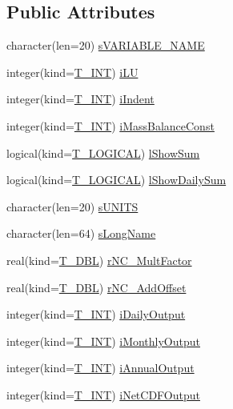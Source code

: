 \subsection*{Public Attributes}
\begin{DoxyCompactItemize}
\item 
character(len=20) \hyperlink{typetypes_1_1_t___s_t_a_t_s_ab81130a44a581fc3b22fea055a9be90d}{sVARIABLE\_\-NAME}
\item 
integer(kind=\hyperlink{namespacetypes_a4e4d040a4425196c4d43be63e7e6103a}{T\_\-INT}) \hyperlink{typetypes_1_1_t___s_t_a_t_s_a045c76162dcdf4837f2f848823b16254}{iLU}
\item 
integer(kind=\hyperlink{namespacetypes_a4e4d040a4425196c4d43be63e7e6103a}{T\_\-INT}) \hyperlink{typetypes_1_1_t___s_t_a_t_s_a36da84bf5db7eb8d8fffac4d6ef768d8}{iIndent}
\item 
integer(kind=\hyperlink{namespacetypes_a4e4d040a4425196c4d43be63e7e6103a}{T\_\-INT}) \hyperlink{typetypes_1_1_t___s_t_a_t_s_aad67d55a488e20d13ecdc72c12b9e1c9}{iMassBalanceConst}
\item 
logical(kind=\hyperlink{namespacetypes_adfa8f4f6096bb7bdbb93f36b911dcaad}{T\_\-LOGICAL}) \hyperlink{typetypes_1_1_t___s_t_a_t_s_a31ce6e9974f157f2d96c8a260e26dc96}{lShowSum}
\item 
logical(kind=\hyperlink{namespacetypes_adfa8f4f6096bb7bdbb93f36b911dcaad}{T\_\-LOGICAL}) \hyperlink{typetypes_1_1_t___s_t_a_t_s_a6e5ccf0b93d97e0fa1c8464f165f02f5}{lShowDailySum}
\item 
character(len=20) \hyperlink{typetypes_1_1_t___s_t_a_t_s_a9d260f63bbbb23de5e7e250e31a670c3}{sUNITS}
\item 
character(len=64) \hyperlink{typetypes_1_1_t___s_t_a_t_s_aa86d81f56dab644208173e846616085e}{sLongName}
\item 
real(kind=\hyperlink{namespacetypes_a888737411068474a167b1c3e5b579c58}{T\_\-DBL}) \hyperlink{typetypes_1_1_t___s_t_a_t_s_a59f5b3b351197c23b589b94847bad0f4}{rNC\_\-MultFactor}
\item 
real(kind=\hyperlink{namespacetypes_a888737411068474a167b1c3e5b579c58}{T\_\-DBL}) \hyperlink{typetypes_1_1_t___s_t_a_t_s_a4f9c70ef6766721c1a39b7788e0fb863}{rNC\_\-AddOffset}
\item 
integer(kind=\hyperlink{namespacetypes_a4e4d040a4425196c4d43be63e7e6103a}{T\_\-INT}) \hyperlink{typetypes_1_1_t___s_t_a_t_s_a7b4fcf742409ce0a286ec3668fa0a112}{iDailyOutput}
\item 
integer(kind=\hyperlink{namespacetypes_a4e4d040a4425196c4d43be63e7e6103a}{T\_\-INT}) \hyperlink{typetypes_1_1_t___s_t_a_t_s_a77fd876612b391731e80b9dc510bb361}{iMonthlyOutput}
\item 
integer(kind=\hyperlink{namespacetypes_a4e4d040a4425196c4d43be63e7e6103a}{T\_\-INT}) \hyperlink{typetypes_1_1_t___s_t_a_t_s_a3972a731a69e531cae121f591caa8c50}{iAnnualOutput}
\item 
integer(kind=\hyperlink{namespacetypes_a4e4d040a4425196c4d43be63e7e6103a}{T\_\-INT}) \hyperlink{typetypes_1_1_t___s_t_a_t_s_a6b3732c4976d703eb1710e526814f97a}{iNetCDFOutput}
\end{DoxyCompactItemize}


